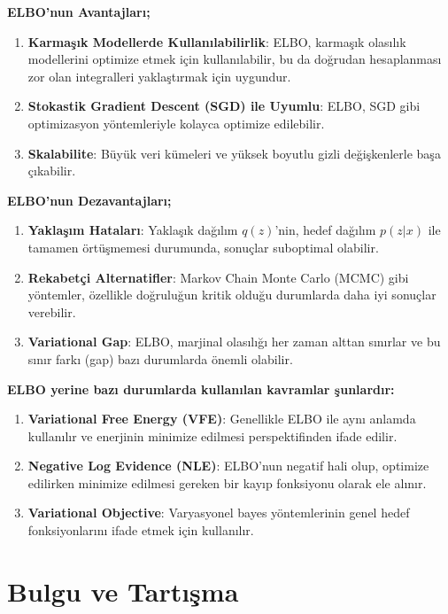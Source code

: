 \documentclass[12pt, a4paper]{article}
\begin{document}
			\textbf{ ELBO'nun Avantajları;}
			\begin{enumerate}
				\item \textbf{Karmaşık Modellerde Kullanılabilirlik}: ELBO, karmaşık olasılık modellerini optimize etmek için kullanılabilir, bu da doğrudan hesaplanması zor olan integralleri yaklaştırmak için uygundur.
				\item \textbf{Stokastik Gradient Descent (SGD) ile Uyumlu}: ELBO, SGD gibi optimizasyon yöntemleriyle kolayca optimize edilebilir.
				\item \textbf{Skalabilite}: Büyük veri kümeleri ve yüksek boyutlu gizli değişkenlerle başa çıkabilir.
			\end{enumerate}
			\newpage
			\textbf{ ELBO'nun Dezavantajları;}  
			\begin{enumerate}
				\item \textbf{Yaklaşım Hataları}: Yaklaşık dağılım \( q(z) \)'nin, hedef dağılım \( p(z|x) \) ile tamamen örtüşmemesi durumunda, sonuçlar suboptimal olabilir.
				\item \textbf{Rekabetçi Alternatifler}: Markov Chain Monte Carlo (MCMC) gibi yöntemler, özellikle doğruluğun kritik olduğu durumlarda daha iyi sonuçlar verebilir.
				\item \textbf{Variational Gap}: ELBO, marjinal olasılığı her zaman alttan sınırlar ve bu sınır farkı (gap) bazı durumlarda önemli olabilir.
			\end{enumerate}
			\vspace*{3\baselineskip}
			\textbf{ELBO yerine bazı durumlarda kullanılan kavramlar şunlardır:}
			\begin{enumerate}
				\item \textbf{Variational Free Energy (VFE)}: Genellikle ELBO ile aynı anlamda kullanılır ve enerjinin minimize edilmesi perspektifinden ifade edilir.
				\item \textbf{Negative Log Evidence (NLE)}: ELBO'nun negatif hali olup, optimize edilirken minimize edilmesi gereken bir kayıp fonksiyonu olarak ele alınır.
				\item \textbf{Variational Objective}: Varyasyonel bayes yöntemlerinin genel hedef fonksiyonlarını ifade etmek için kullanılır.
			\end{enumerate}

	\newpage
	\section{Bulgu ve Tartışma}
\end{document}
